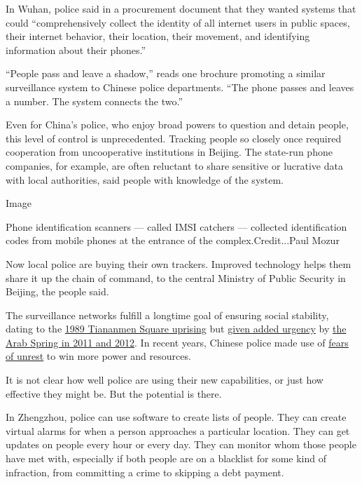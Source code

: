 In Wuhan, police said in a procurement document that they wanted systems
that could ``comprehensively collect the identity of all internet users
in public spaces, their internet behavior, their location, their
movement, and identifying information about their phones.''

``People pass and leave a shadow,'' reads one brochure promoting a
similar surveillance system to Chinese police departments. ``The phone
passes and leaves a number. The system connects the two.''

Even for China's police, who enjoy broad powers to question and detain
people, this level of control is unprecedented. Tracking people so
closely once required cooperation from uncooperative institutions in
Beijing. The state-run phone companies, for example, are often reluctant
to share sensitive or lucrative data with local authorities, said people
with knowledge of the system.

Image

Phone identification scanners --- called IMSI catchers --- collected
identification codes from mobile phones at the entrance of the
complex.Credit...Paul Mozur

Now local police are buying their own trackers. Improved technology
helps them share it up the chain of command, to the central Ministry of
Public Security in Beijing, the people said.

The surveillance networks fulfill a longtime goal of ensuring social
stability, dating to the
\href{https://www.nytimes3xbfgragh.onion/2019/05/30/world/asia/tiananmen-square-protest-photos.html}{1989
Tiananmen Square uprising} but
\href{https://www.nytimes3xbfgragh.onion/2013/07/21/world/asia/death-in-china-stirs-anger-over-urban-rule-enforcers.html}{given
added urgency} by
\href{https://www.nytimes3xbfgragh.onion/2017/12/04/world/middleeast/ali-abdullah-saleh-strongmen.html}{the
Arab Spring in 2011 and 2012}. In recent years, Chinese police made use
of
\href{https://www.nytimes3xbfgragh.onion/2015/12/28/world/asia/china-passes-antiterrorism-law-that-critics-fear-may-overreach.html}{fears
of unrest} to win more power and resources.

It is not clear how well police are using their new capabilities, or
just how effective they might be. But the potential is there.

In Zhengzhou, police can use software to create lists of people. They
can create virtual alarms for when a person approaches a particular
location. They can get updates on people every hour or every day. They
can monitor whom those people have met with, especially if both people
are on a blacklist for some kind of infraction, from committing a crime
to skipping a debt payment.

